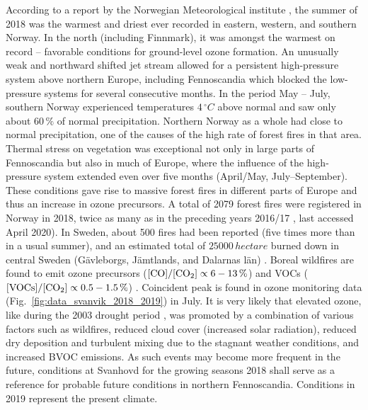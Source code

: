\documentclass[bg, manuscript]{copernicus}
\begin{document}
According to a report by the Norwegian Meteorological institute \citep{MetNOR2019}, the summer of 2018 was the warmest and driest ever recorded in eastern, western, and southern Norway. In the north (including Finnmark), it was amongst the warmest on record -- favorable conditions for ground-level ozone formation.
An unusually weak and northward shifted jet stream allowed for a persistent high-pressure system above northern Europe, including Fennoscandia which blocked the low-pressure systems for several consecutive months. In the period May -- July, southern Norway experienced temperatures $4\,\unit{^\circ C}$ above normal and saw only about $60\,\unit{\%}$ of normal precipitation. Northern Norway as a whole had close to normal precipitation, one of the causes of the high rate of forest fires in that area.
Thermal stress on vegetation was exceptional not only in large parts of Fennoscandia but also in much of Europe, where the influence of the high-pressure system extended even over five months (April/May, July--September). These conditions gave rise to massive forest fires in different parts of Europe and thus an increase in ozone precursors.
A total of 2079 forest fires were registered in Norway in 2018, twice as many as in the preceding years 2016/17 \citep{DSB2019}, last accessed April 2020). In Sweden, about 500 fires had been reported (five times more than in a usual summer), and an estimated total of $25000\,\unit{hectare}$ burned down in central Sweden (G\"{a}vleborgs, J\"{a}mtlands, and Dalarnas l\"{a}n) \citep{SOU2019}. Boreal wildfires are found to emit ozone precursors  ($\chem{[CO]}/\chem{[CO_2]} \propto 6-13\,\unit{\%}$) and VOCs ($\chem{[VOCs]}/\chem{[CO_2]} \propto 0.5-1.5\,\unit{\%}$) \citep{AE:Cofer1990}. Coincident peak  is found in ozone monitoring data (Fig.~\ref{fig:data_svanvik_2018_2019}) in July. It is very likely that elevated ozone, like during the 2003 drought period \citep{JGR:Solberg2018}, was promoted by a combination of various factors such as wildfires, reduced cloud cover (increased solar radiation), reduced dry deposition and turbulent mixing due to the stagnant weather conditions, and increased BVOC emissions. As such events may become more frequent in the future, conditions at Svanhovd for the growing seasons 2018 shall serve as a reference for probable future conditions in northern Fennoscandia. Conditions in 2019 represent the present climate.\\
\end{document}
